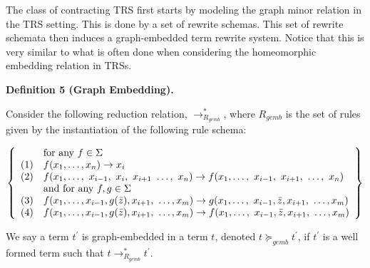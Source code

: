  
 
The class of contracting TRS first starts by modeling the graph minor relation in the TRS setting. This is done by a set of rewrite schemas. This set of rewrite schemata then induces a graph-embedded term rewrite system. Notice that this is very similar to what is often done when considering the homeomorphic embedding relation in TRSs.\par
 
 
 
\par\medskip\noindent\textbf{Definition 5 (Graph Embedding).}\par
 
 
Consider the following reduction relation, $\rightarrow^{*}_{R_{gemb}}$, where $R_{gemb}$ is the set of rules given by the instantiation of the following rule schema:\par
    \[\left\{\begin{array}[]{ll}&\text{for any }f\in\Sigma\\
(1)&f(x_{1},\ldots,x_{n})\rightarrow x_{i}\\
(2)&f(x_{1},\ldots,\leavevmode\nobreak\ x_{i-1},\leavevmode\nobreak\ x_{i},%
\leavevmode\nobreak\ x_{i+1}\leavevmode\nobreak\ \ldots,\leavevmode\nobreak\ x%
_{n})\rightarrow f(x_{1},\ldots,\leavevmode\nobreak\ x_{i-1},\leavevmode%
\nobreak\ x_{i+1},\leavevmode\nobreak\ \ldots,\leavevmode\nobreak\ x_{n})\\
&\text{and for any }f,g\in\Sigma\\
(3)&f(x_{1},\ldots,x_{i-1},g(\bar{z}),x_{i+1},\leavevmode\nobreak\ \ldots,x_{m%
})\rightarrow g(x_{1},\ldots,\leavevmode\nobreak\ x_{i-1},\bar{z},x_{i+1},%
\leavevmode\nobreak\ \ldots,x_{m})\\
(4)&f(x_{1},\ldots,x_{i-1},g(\bar{z}),x_{i+1},\leavevmode\nobreak\ \ldots,x_{m%
})\rightarrow f(x_{1},\ldots,\leavevmode\nobreak\ x_{i-1},\bar{z},x_{i+1},%
\leavevmode\nobreak\ \ldots,x_{m})\end{array}\right\}\]    
 
 
We say a term $t^{\prime}$ is graph-embedded in a term $t$, denoted $t\succcurlyeq_{gemb}t^{\prime}$, if $t^{\prime}$ is a well formed term such that $t\rightarrow_{R_{gemb}}^{*}t^{\prime}$.\par
 
